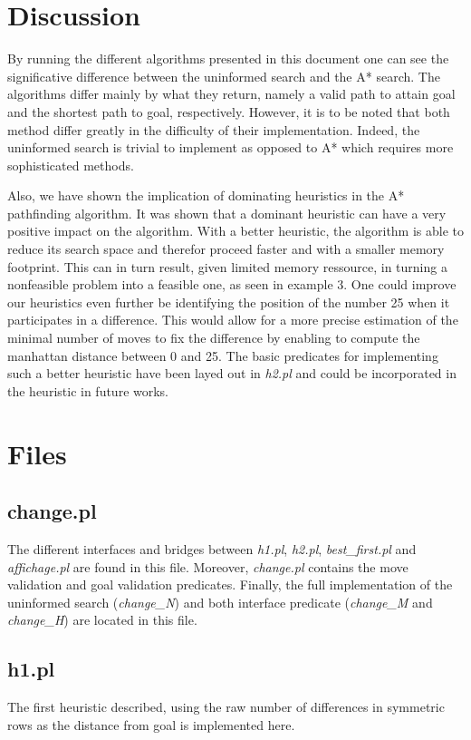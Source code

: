 \documentclass[12pt]{article}
\begin{document}
\section{Discussion}
By running the different algorithms presented in this document one can see the significative difference between the uninformed search and the A* search.  The algorithms differ mainly by what they return, namely a valid path to attain goal and the shortest path to goal, respectively.  However, it is to be noted that both method differ greatly in the difficulty of their implementation.  Indeed, the uninformed search is trivial to implement as opposed to A* which requires more sophisticated methods.

Also, we have shown the implication of dominating heuristics in the A* pathfinding algorithm.  It was shown that a dominant heuristic can have a very positive impact on the algorithm.  With a better heuristic, the algorithm is able to reduce its search space and therefor proceed faster and with a smaller memory footprint.  This can in turn result, given limited memory ressource, in turning a nonfeasible problem into a feasible one, as seen in example 3.  One could improve our heuristics even further be identifying the position of the number 25 when it participates in a difference.  This would allow for a more precise estimation of the minimal number of moves to fix the difference by enabling to compute the manhattan distance between 0 and 25.  The basic predicates for implementing such a better heuristic have been layed out in \textit{h2.pl} and could be incorporated in the heuristic in future works.

\section{Files}
\subsection{change.pl}
The different interfaces and bridges between \textit{h1.pl}, \textit{h2.pl}, \textit{best\_first.pl} and \textit{affichage.pl} are found in this file. Moreover, \textit{change.pl} contains the move validation and goal validation predicates.  Finally, the full implementation of the uninformed search (\textit{change\_N}) and both interface predicate (\textit{change\_M} and \textit{change\_H}) are located in this file. 
\subsection{h1.pl}
The first heuristic described, using the raw number of differences in symmetric rows as the distance from goal is implemented here.
\end{document}
